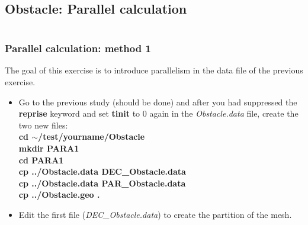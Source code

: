 \documentclass[10pt]{beamer}
\begin{document}
\subsection{Obstacle: Parallel calculation}
\begin{frame}
\begin{columns}[c] 
\tableofcontents[sections={1-7},currentsection, currentsubsection]
\tableofcontents[sections={8-13},currentsection, currentsubsection]
\end{columns}
\end{frame}
\begin{frame}
\frametitle{Parallel calculation: method 1}
\begin{block}{}

The goal of this exercise is to introduce parallelism in the data file of the previous exercise.

\begin{itemize}
\item Go to the previous study (should be done) and after you had suppressed the \textbf{reprise} keyword and set \textbf{tinit} to 0 again in the \textit{Obstacle.data} file, create the two new files:\\
\textbf{cd $\sim$/test/yourname/Obstacle} \\
\textbf{mkdir PARA1} \\
\textbf{cd PARA1} \\
\textbf{cp ../Obstacle.data DEC\_Obstacle.data} \\
\textbf{cp ../Obstacle.data PAR\_Obstacle.data} \\
\textbf{cp ../Obstacle.geo .}\\
\vspace{0.3cm}
\item Edit the first file (\textit{DEC\_Obstacle.data}) to create the partition of the mesh.
\end{itemize}

\end{block}
\end{frame}
\end{document}
